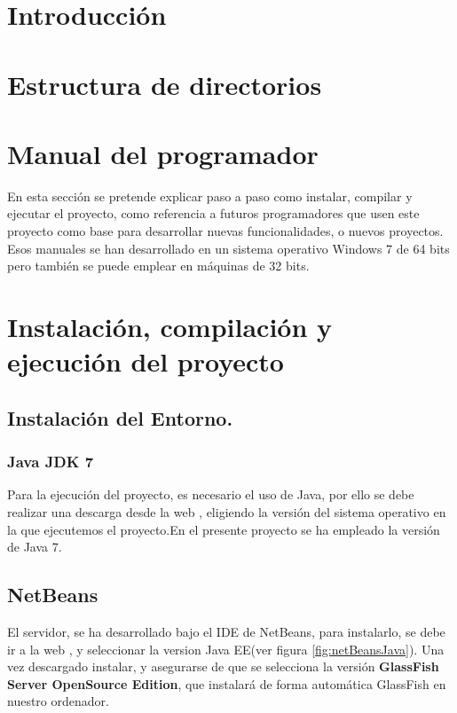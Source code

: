 
\section{Introducción}

\section{Estructura de directorios}

\section{Manual del programador}
En esta sección se pretende explicar paso a paso como instalar, compilar y ejecutar el proyecto, como referencia a futuros programadores que usen este proyecto como base para desarrollar nuevas funcionalidades, o nuevos proyectos.
Esos manuales se han desarrollado en un sistema operativo Windows 7 de 64 bits pero también se puede emplear en máquinas de 32 bits.
\section{Instalación, compilación y ejecución del proyecto}

\subsection{Instalación del Entorno.}
	\subsubsection{Java JDK 7}
	Para la ejecución del proyecto, es necesario el uso de Java, por ello se debe realizar una descarga desde la web \cite{java}, eligiendo la versión del sistema operativo en la que ejecutemos el proyecto.En el presente proyecto se ha empleado la versión de Java 7.
	\subsection{NetBeans}
	El servidor, se ha desarrollado bajo el IDE de NetBeans, para instalarlo, se debe ir a la web \cite{netbeans}, y seleccionar la version Java EE(ver figura \ref{fig:netBeansJava}).
	Una vez descargado instalar, y asegurarse de que se selecciona la versión \textbf{GlassFish Server OpenSource Edition}, que instalará de forma automática GlassFish en nuestro ordenador.
	
